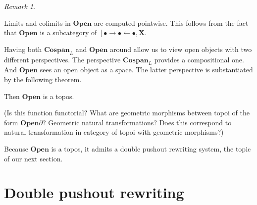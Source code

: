 \documentclass{amsart}
\newcommand{\X}{\cat{X}}
\newcommand{\cat}[1]{\mathbf{#1}}
\newcommand{\Cospan}{\mathbf{Cospan}}
\newcommand{\OpenOb}{\mathbf{Open} }
\newcommand{\edit}[1]{\textcolor{editcolour}{(#1)}}
\newenvironment{exposition}[1]{}{}
\theoremstyle{remark}
\newtheorem{remark}[theorem]{Remark}
\theoremstyle{definition}
\begin{document}
\begin{remark}
  \label{thm:open-obj-ptwise-limits}

  Limits and colimits in \( \OpenOb \) are computed pointwise. This
  follows from the fact that \( \OpenOb \) is a subcategory of \(
  \left[ \bullet \to \bullet \gets \bullet , \X \).   
  
\end{remark}


\begin{exposition}{}
  
  Having both $ \Cospan_L $ and $ \OpenOb $ around
  allow us to view open objects with two different perspectives.
  The perspective \( \Cospan_L \) provides a compositional one. And \(
  \OpenOb \) sees an open object as a space. The latter perspective is
  substantiated by the following theorem.
  
\end{exposition}

\begin{thm}
  \label{thm:OpenObTopos}

  Then $ \OpenOb $ is a topos.
  
\end{thm}

\edit{Is this function functorial?  What are geometric morphisms
  between topoi of the form $ \OpenOb{\partial} $?  Geometric natural
  transformations?  Does this correspond to natural transformation in
  category of topoi with geometric morphisms?}

\begin{exposition}{}

  Because $ \OpenOb $ is a topos, it admits a double
  pushout rewriting system, the topic of our next section.

\end{exposition}


\section{Double pushout rewriting}
\label{sec:double-push-rewr}

  
\end{document}
